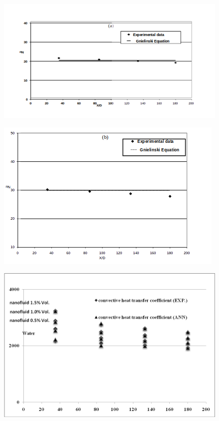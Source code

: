 \documentclass{article}
\begin{document}
\begin{figure}
	\centering
	\includegraphics[width=0.8\linewidth]{fig2}
	\caption{}
	\label{fig:fig2}
\end{figure}

\begin{figure}
	\centering
	\includegraphics[width=0.8\linewidth]{fig3}
	\caption{}
	\label{fig:fig3}
\end{figure}

\begin{figure}
	\centering
	\includegraphics[width=0.9\linewidth]{fig4}
	\caption{}
	\label{fig:fig4}
\end{figure}
\end{document}
